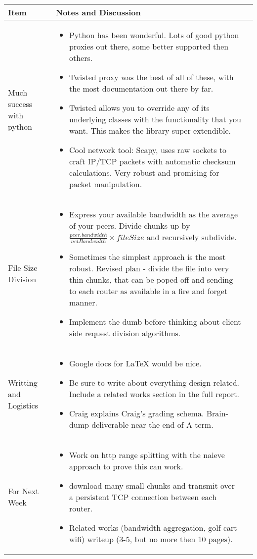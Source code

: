 \documentclass[a4wide,10pt]{extarticle}
\begin{document}
\vspace{0.5cm}
\begin{center}
\begin{tabular}{| m{3.0cm} | m{12.6cm} | m{2cm}|} \hline
\textbf{Item} & \textbf{Notes and Discussion}\\ \hline

Much success with python & 
	\begin{itemize}
		\item Python has been wonderful. Lots of good python proxies out there, some better supported then others.
		\item Twisted proxy was the best of all of these, with the most documentation out there by far. 
		\item Twisted allows you to override any of its underlying classes with the functionality that you want. This makes the library super extendible.
		\item Cool network tool: Scapy, uses raw sockets to craft IP/TCP packets with automatic checksum calculations. Very robust and promising for packet manipulation. 
	\end{itemize} 
\\ \hline
File Size Division &
	\begin{itemize}
		\item Express your available bandwidth as the average of your peers. Divide chunks up by $\frac{peer.bandwidth}{netBandwidth} \times{fileSize}$ and recursively subdivide.
		\item Sometimes the simplest approach is the most robust. Revised plan - divide the file into very thin chunks, that can be poped off and sending to each router as available in a fire and forget manner.
		\item Implement the dumb before thinking about client side request division algorithms.
	\end{itemize}
\\ \hline
Writting and Logistics &
	\begin{itemize}
		\item Google docs for LaTeX would be nice.
		\item Be sure to write about everything design related. Include a related works section in the full report.
		\item Craig explains Craig's grading schema. Brain-dump deliverable near the end of A term.
	\end{itemize}
\\ \hline

For Next Week &
	\begin{itemize}
		\item Work on http range splitting with the naieve approach to prove this can work.
		\item download many small chunks and transmit over a persistent TCP connection between each router.
		\item Related works (bandwidth aggregation, golf cart wifi) writeup (3-5, but no more then 10 pages).
	\end{itemize}
\\ \hline

\end{tabular}
\end{center}
\end{document}
